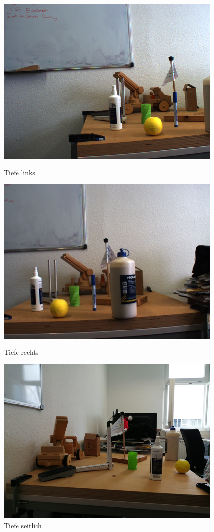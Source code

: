 \begin{figure}[!htb]
	\includegraphics[width=\linewidth]{bilder/depth_left}
	\caption{Tiefe links}\label{fig:awesome_image1}
	\endminipage\hfill
	\includegraphics[width=\linewidth]{bilder/depth_right}
	\caption{Tiefe rechts}\label{fig:awesome_image2}
	\endminipage\hfill
	\includegraphics[width=\linewidth]{bilder/depth_side}
	\caption{Tiefe seitlich}\label{fig:awesome_image3}
	\endminipage
\end{figure}

